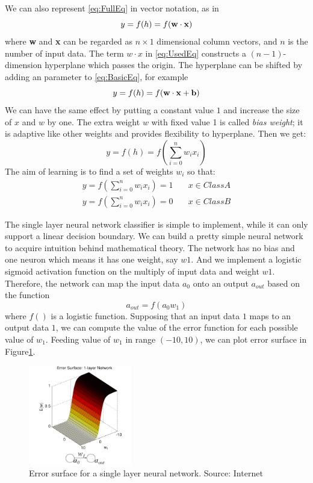 We can also represent \ref{eq:FullEq} in vector notation, as in 
\begin{equation}\label{eq:UsedEq}
y = f(h) = f(\bf w \cdot x)
\end{equation}
where \textbf{w} and \textbf{x} can be regarded as $n\times1$ dimensional column vectors, and $n$ is the number of input data.
The term $w \cdot x$ in \ref{eq:UsedEq} constructs a $(n-1)$-dimension hyperplane which passes the origin. The hyperplane can be shifted by adding an parameter to \ref{eq:BasicEq}, for example
\begin{equation}\label{eq:WithBias}
y = f(h) = f(\bf w \cdot x + b)
\end{equation}
We can have the same effect by putting a constant value $1$ and increase the size of $x$ and $w$ by one. The extra weight $w$ with fixed value 1 is called \textit{bias weight}; it is adaptive like other weights and provides flexibility to hyperplane. Then we get:
\begin{equation}\label{eq:finalEq}
y = f(h) = f(\sum_{i=0}^{n}w_{i}x_{i})
\end{equation}
The aim of learning is to find a set of weights $w_{i}$ so that:
\begin{align*}
y = f(\sum_{i=0}^{n}w_{i}x_{i}) = 1  & \quad x \in Class A\\
y = f(\sum_{i=0}^{n}w_{i}x_{i}) = 0  & \quad x \in Class B
\end{align*}

The single layer neural network classifier is simple to implement, while it can only support a linear decision boundary. We can build a pretty simple neural network to acquire intuition behind mathematical theory. The network has no bias and one neuron which means it has one weight, say $w1$. And we implement a logistic sigmoid activation function on the multiply of input data and weight $w1$. Therefore, the network can map the input data $a_0$ onto an output $a_{out}$ based on the function
\begin{equation}\label{eq:1LayerExample}
a_{out} = f(a_{0}w_{1})
\end{equation}
where $f()$ is a logistic function. Supposing that an input data $1$ maps to an output data $1$, we can compute the value of the error function for each possible value of $w_{1}$. Feeding value of $w_{1}$ in range $(-10,10)$, we can plot error surface in Figure\ref{fig:1LayerErrorSurface}.
\graphicspath{ {./Figures/} }
\begin{figure}[!htb]
\centering
\includegraphics[width=0.4\textwidth]{1LayerErrorSurface.png}
\caption{\label{fig:1LayerErrorSurface}Error surface for a single layer neural network. Source: Internet}
\end{figure}

